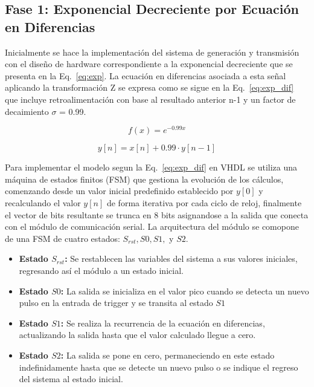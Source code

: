 \documentclass[conference]{IEEEtran}
\begin{document}
\subsection{Fase 1: Exponencial Decreciente por Ecuación en Diferencias}
Inicialmente se hace la implementación del sistema de generación y transmisión con el diseño de hardware correspondiente a la exponencial decreciente que se presenta en la Eq.~\ref{eq:exp}. La ecuación en diferencias asociada a esta señal aplicando la transformación Z se expresa como se sigue en la Eq.~\ref{eq:exp_dif} que incluye retroalimentación con base al resultado anterior n-1 y un factor de decaimiento \( \sigma \) = 0.99.

\begin{equation}
    f(x) = e^{-0.99x}
    \label{eq:exp}
\end{equation}

\begin{equation}
    y[n] = x[n] + 0.99 \cdot y[n-1]
    \label{eq:exp_dif}
\end{equation}

Para implementar el modelo segun la Eq.~\ref{eq:exp_dif} en VHDL se utiliza una máquina de estados finitos (FSM) que gestiona la evolución de los cálculos, comenzando desde un valor inicial predefinido establecido por $y[0]$ y recalculando el valor $y[n]$ de forma iterativa por cada ciclo de reloj, finalmente el vector de bits resultante se trunca en 8 bits asignandose a la salida que conecta con el módulo de comunicación serial. La arquitectura del módulo se comopone de una FSM de cuatro estados: \( S_{rst}, S0, S1, \) y \( S2 \).

\begin{itemize}
    \item \textbf{Estado \( S_{rst} \):} Se restablecen las variables del sistema a sus valores iniciales, regresando así el módulo a un estado inicial.
    \item \textbf{Estado \( S0 \):} La salida se inicializa en el valor pico cuando se detecta un nuevo pulso en la entrada de trigger y se transita al estado \( S1 \)
    \item \textbf{Estado \( S1 \):} Se realiza la recurrencia de la ecuación en diferencias, actualizando la salida hasta que el valor calculado llegue a cero.
    \item \textbf{Estado \( S2 \):} La salida se pone en cero, permaneciendo en este estado indefinidamente hasta que se detecte un nuevo pulso o se indique el regreso del sistema al estado inicial.
\end{itemize}
\end{document}
